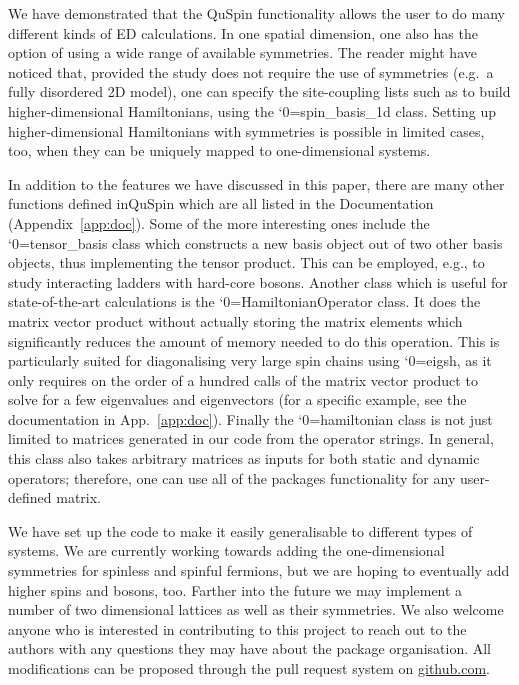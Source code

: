 \documentclass{SciPost}
\newcommand\0{\scalebox{-1}[1]{0}}
\let\svttfamily\ttfamily
\renewcommand\ttfamily{\svttfamily\catcode`0=\active }
\renewcommand\texttt{\bgroup\ttfamily\texttthelp}
\def\texttthelp#1{#1\egroup}
\begin{document}
We have demonstrated that the QuSpin functionality allows the user to do many different kinds of ED calculations. In one spatial dimension, one also has the option of using a wide range of available symmetries. The reader might have noticed that, provided the study does not require the use of symmetries (e.g.~a fully disordered 2D model), one can specify the site-coupling lists such as to build higher-dimensional Hamiltonians, using the \texttt{spin\_basis\_1d} class. Setting up higher-dimensional Hamiltonians with symmetries is possible in limited cases, too, when they can be uniquely mapped to one-dimensional systems. 

In addition to the features we have discussed in this paper, there are many other functions defined inQuSpin which are all listed in the Documentation (Appendix~\ref{app:doc}). Some of the more interesting ones include the \texttt{tensor\_basis} class which constructs a new basis object out of two other basis objects, thus implementing the tensor product. This can be employed, e.g., to study interacting ladders with hard-core bosons. Another class which is useful for state-of-the-art calculations is the \texttt{HamiltonianOperator} class. It does the matrix vector product without actually storing the matrix elements which significantly reduces the amount of memory needed to do this operation. This is particularly suited for diagonalising very large spin chains using \texttt{eigsh}, as it only requires on the order of a hundred calls of the matrix vector product to solve for a few eigenvalues and eigenvectors (for a specific example, see the documentation in App.~\ref{app:doc}). Finally the \texttt{hamiltonian} class is not just limited to matrices generated in our code from the operator strings. In general, this class also takes arbitrary matrices as inputs for both static and dynamic operators; therefore, one can use all of the packages functionality for any user-defined matrix.

We have set up the code to make it easily generalisable to different types of systems. We are currently working towards adding the one-dimensional symmetries for spinless and spinful fermions, but we are hoping to eventually add higher spins and bosons, too. Farther into the future we may implement a number of two dimensional lattices as well as their symmetries. We also welcome anyone who is interested in contributing to this project to reach out to the authors with any questions they may have about the package organisation. All modifications can be proposed through the pull request system on \href{https://github.com/weinbe58/qspin}{github.com}.  
\end{document}
